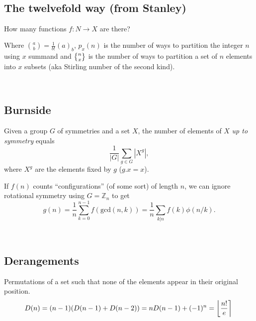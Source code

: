 \


    \subsection{The twelvefold way (from Stanley)} How many functions $f \colon N \rightarrow X$ are there?


      Where $\binom{a}{b} = \frac{1}{b!}(a)_b $, $p_x(n)$ is the number of ways to partition the integer $n$ using $x$ summand and $\stirlingsecond{n}{x}$ is the number of ways to partition a set of $n$ elements into $x$ subsets (aka Stirling number of the second kind).


\

	
\subsection{Burnside}
Given a group $G$ of symmetries and a set $X$, the number of elements of $X$ \emph{up to symmetry} equals
		 \[ {\frac {1}{|G|}}\sum _{{g\in G}}|X^{g}|, \]
		 where $X^{g}$ are the elements fixed by $g$ ($g.x = x$).

 If $f(n)$ counts ``configurations'' (of some sort) of length $n$, we can ignore rotational symmetry using $G = \mathbb Z_n$ to get
		 \[ g(n) = \frac 1 n \sum_{k=0}^{n-1}{f(\text{gcd}(n, k))} = \frac 1 n \sum_{k|n}{f(k)\phi(n/k)}. \]


\

\subsection{Derangements}
		Permutations of a set such that none of the elements appear in their original position.
		\small
		\[ \mkern-2mu D(n) = (n-1)(D(n-1)+D(n-2)) = n D(n-1)+(-1)^n = \left\lfloor\frac{n!}{e}\right\rceil \]
		\normalsize

